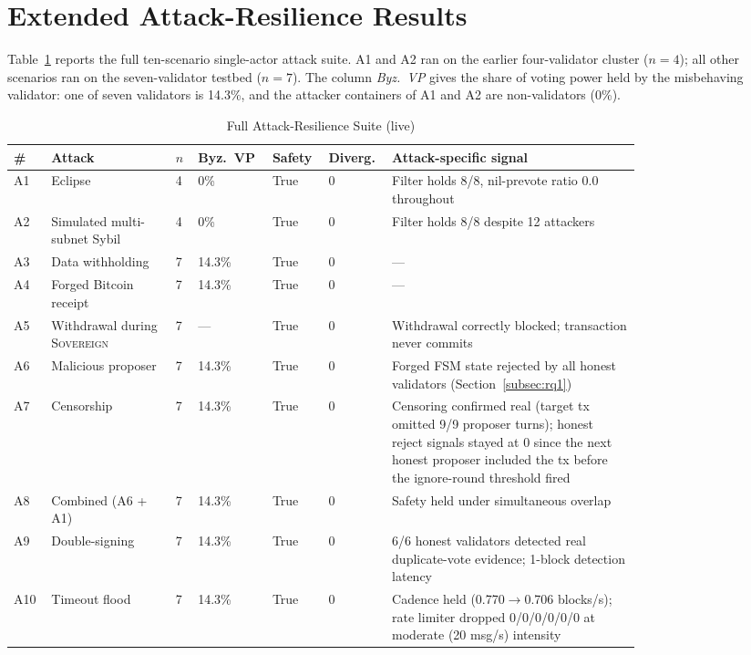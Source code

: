 \section{Extended Attack-Resilience Results}
\label{app:attacks}

Table~\ref{tab:attack-full} reports the full ten-scenario single-actor
attack suite. A1 and A2 ran on the earlier four-validator cluster ($n{=}4$);
all other scenarios ran on the seven-validator testbed ($n{=}7$). The column
\emph{Byz.\ VP} gives the share of voting power held by the misbehaving
validator: one of seven validators is 14.3\%, and the attacker containers of
A1 and A2 are non-validators (0\%).

\begin{table}[h]
\caption{Full Attack-Resilience Suite (live)}
\label{tab:attack-full}
\centering
\footnotesize
\begin{tabular}{@{}p{0.04\linewidth}p{0.18\linewidth}p{0.03\linewidth}p{0.07\linewidth}p{0.06\linewidth}p{0.06\linewidth}p{0.36\linewidth}@{}}
\toprule
\textbf{\#} & \textbf{Attack} & \textbf{$n$} & \textbf{Byz.\ VP} & \textbf{Safety} & \textbf{Diverg.} & \textbf{Attack-specific signal} \\
\midrule
A1 & Eclipse & 4 & 0\% & True & 0 & Filter holds 8/8, nil-prevote ratio 0.0 throughout \\
A2 & Simulated multi-subnet Sybil & 4 & 0\% & True & 0 & Filter holds 8/8 despite 12 attackers \\
A3 & Data withholding & 7 & 14.3\% & True & 0 & --- \\
A4 & Forged Bitcoin receipt & 7 & 14.3\% & True & 0 & --- \\
A5 & Withdrawal during \textsc{Sovereign} & 7 & --- & True & 0 & Withdrawal correctly blocked; transaction never commits \\
A6 & Malicious proposer & 7 & 14.3\% & True & 0 & Forged FSM state rejected by all honest validators (Section~\ref{subsec:rq1}) \\
A7 & Censorship & 7 & 14.3\% & True & 0 & Censoring confirmed real (target tx omitted 9/9 proposer turns); honest reject signals stayed at 0 since the next honest proposer included the tx before the ignore-round threshold fired \\
A8 & Combined (A6 + A1) & 7 & 14.3\% & True & 0 & Safety held under simultaneous overlap \\
A9 & Double-signing & 7 & 14.3\% & True & 0 & 6/6 honest validators detected real duplicate-vote evidence; 1-block detection latency \\
A10 & Timeout flood & 7 & 14.3\% & True & 0 & Cadence held (0.770$\to$0.706 blocks/s); rate limiter dropped 0/0/0/0/0/0 at moderate (20 msg/s) intensity \\
\bottomrule
\end{tabular}
\end{table}

